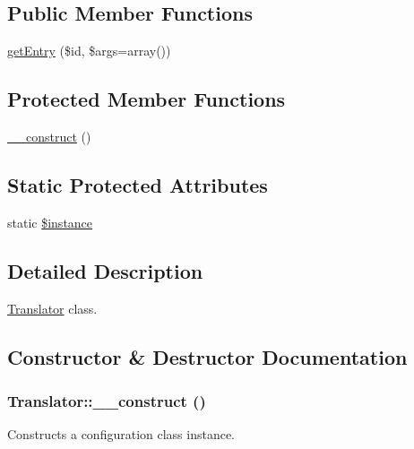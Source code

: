 \subsection*{Public Member Functions}
\begin{DoxyCompactItemize}
\item 
\hyperlink{classTranslator_a889df34e7a06e9126b202cab6241dc10}{getEntry} (\$id, \$args=array())
\end{DoxyCompactItemize}
\subsection*{Protected Member Functions}
\begin{DoxyCompactItemize}
\item 
\hyperlink{classTranslator_a29af4c462256cc6919e8980dbd04049c}{\_\-\_\-construct} ()
\end{DoxyCompactItemize}
\subsection*{Static Protected Attributes}
\begin{DoxyCompactItemize}
\item 
static \hyperlink{classTranslator_a5003e4312c37dc1c83fde700e5ee1e9f}{\$instance}
\end{DoxyCompactItemize}


\subsection{Detailed Description}
\hyperlink{classTranslator}{Translator} class. 

\subsection{Constructor \& Destructor Documentation}
\hypertarget{classTranslator_a29af4c462256cc6919e8980dbd04049c}{
\subsubsection[{\_\-\_\-construct}]{\setlength{\rightskip}{0pt plus 5cm}Translator::\_\-\_\-construct ()}}
\label{classTranslator_a29af4c462256cc6919e8980dbd04049c}
Constructs a configuration class instance. 

